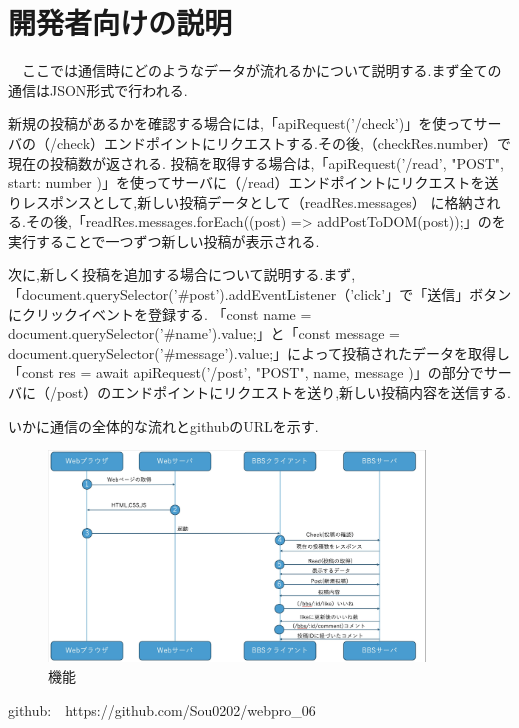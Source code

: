 \documentclass{jsarticle}
\begin{document}
\section{開発者向けの説明}
　ここでは通信時にどのようなデータが流れるかについて説明する.まず全ての通信はJSON形式で行われる.\par
新規の投稿があるかを確認する場合には,「apiRequest('/check')」を使ってサーバの（/check）エンドポイントにリクエストする.その後,（checkRes.number）で現在の投稿数が返される.
投稿を取得する場合は,「apiRequest('/read', "POST", { start: number })」を使ってサーバに（/read）エンドポイントにリクエストを送りレスポンスとして,新しい投稿データとして（readRes.messages）
に格納される.その後,「readRes.messages.forEach((post) => addPostToDOM(post));」のを実行することで一つずつ新しい投稿が表示される.\par
次に,新しく投稿を追加する場合について説明する.まず,「document.querySelector('#post').addEventListener（'click'」で「送信」ボタンにクリックイベントを登録する.
「const name = document.querySelector('#name').value;」と「const message = document.querySelector('#message').value;」によって投稿されたデータを取得し
「const res = await apiRequest('/post', "POST", { name, message })」の部分でサーバに（/post）のエンドポイントにリクエストを送り,新しい投稿内容を送信する.\par
いかに通信の全体的な流れとgithubのURLを示す.\par

\begin{figure}[H]
    \centering
    \includegraphics[width=10cm]{fig/zu.jpeg}
    \caption{機能}
    \label{photoreflector_characteristic}
\end{figure}

\par
github:　https://github.com/Sou0202/webpro_06
\end{document}
